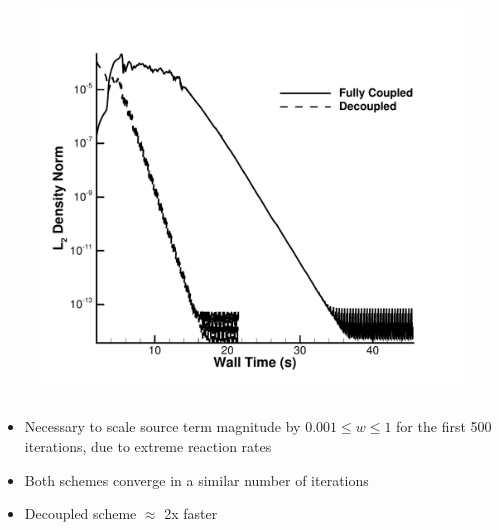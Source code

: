 \documentclass{beamer}
\begin{document}
\begin{frame}
\begin{columns}[t]
\begin{column}{0.5\textwidth}
\begin{figure}[h!]
	  \includegraphics[width=\textwidth]{figures/cone_walltime}
        \end{figure}
      \end{column}
    \end{columns}
  \begin{itemize}
    \item Necessary to scale source term magnitude by $0.001 \leq w \leq 1$ 
      for the first 500 iterations, due to extreme reaction rates
    \item Both schemes converge in a similar number of iterations
    \item Decoupled scheme $\approx$ 2x faster
  \end{itemize}
\end{frame}
\end{document}
